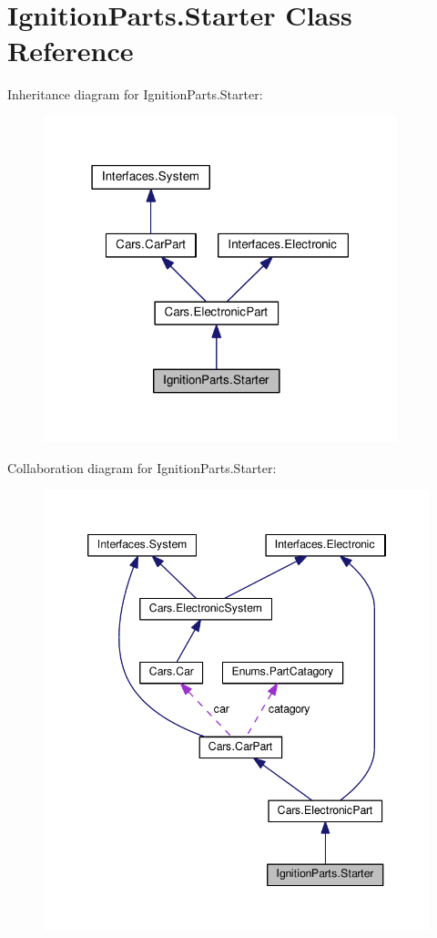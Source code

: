 \hypertarget{classIgnitionParts_1_1Starter}{}\section{Ignition\+Parts.\+Starter Class Reference}
\label{classIgnitionParts_1_1Starter}


Inheritance diagram for Ignition\+Parts.\+Starter\+:\nopagebreak
\begin{figure}[H]
\begin{center}
\leavevmode
\includegraphics[width=291pt]{classIgnitionParts_1_1Starter__inherit__graph}
\end{center}
\end{figure}


Collaboration diagram for Ignition\+Parts.\+Starter\+:\nopagebreak
\begin{figure}[H]
\begin{center}
\leavevmode
\includegraphics[width=346pt]{classIgnitionParts_1_1Starter__coll__graph}
\end{center}
\end{figure}
